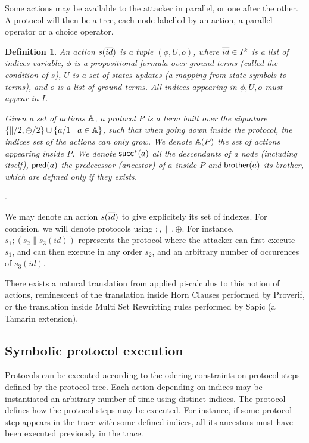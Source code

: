 \documentclass[a4paper]{article}
\newtheorem{definition}{Definition}
\theoremstyle{remark}
\begin{document}
Some actions may be available to the attacker in parallel, or one
after the other. A protocol will then be a tree, each node labelled by an action, a parallel operator or a choice operator.

\begin{definition}
An action $s(\overline{id})$ is a tuple $(\phi,U,o)$, where $\overline{id} \in I^k$ is a list of indices variable, $\phi$ is a propositional formula over ground terms (called the condition of $s$), $U$ is a set of states updates (a mapping from state symbols to terms), and $o$ is a list of ground terms.
All indices appearing in $\phi,U,o$ must appear in $I$.

Given a set of actions $\mathbb{A}$, a protocol $P$ is a term built over the signature $\{\|/2,\oplus/2\} \cup \{a/1 \mid a \in \mathbb{A}\}$, such that when going down inside the protocol, the indices set of the actions can only grow. We denote $\mathbb{A}(P)$ the set of actions appearing inside $P$. We denote $\textsf{succ}^*(a)$ all the descendants of a node (including itself), $\textsf{pred}(a)$ the predecessor (ancestor) of $a$ inside $P$ and $\textsf{brother}(a)$ its brother, which are defined only if they exists.
\end{definition}.

We may denote an acrion $s(\overline{id})$ to give explicitely its set of indexes.
For concision, we will denote protocols using $;,\|,\oplus$. For instance, $s_1; (s_2 \| s_3(id))$ represents the protocol where the attacker can first execute $s_1$, and can then execute in any order $s_2$, and an arbitrary number of occurences of $s_3(id)$.

There exists a natural translation from applied pi-calculus to this notion of actions, reminescent of the translation inside Horn Clauses performed by Proverif, or the translation inside Multi Set Rewritting rules performed by Sapic (a Tamarin extension).

\subsection{Symbolic protocol execution}

Protocols can be executed according to the odering constraints on protocol steps defined by the protocol tree.
Each action depending on indices may be instantiated an arbitrary number of time using distinct indices. The protocol defines how the protocol steps may be executed. For instance, if some protocol step appears in
the trace with some defined indices, all its ancestors must have been executed previously in the trace.
\end{document}
